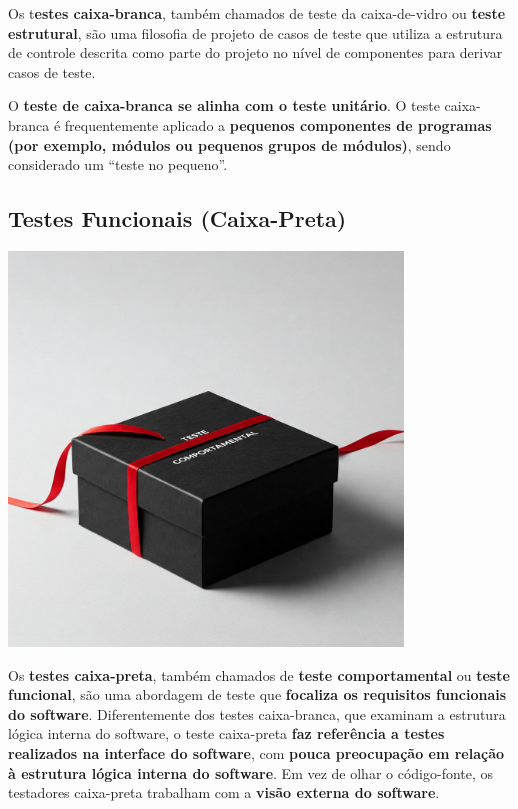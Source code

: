 \documentclass[
]{book}
\begin{document}
Os t\textbf{estes caixa-branca}, também chamados de teste da caixa-de-vidro ou \textbf{teste estrutural}, são uma filosofia de projeto de casos de teste que utiliza a estrutura de controle descrita como parte do projeto no nível de componentes para derivar casos de teste.

O \textbf{teste de caixa-branca se alinha com o teste unitário}. O teste caixa-branca é frequentemente aplicado a \textbf{pequenos componentes de programas (por exemplo, módulos ou pequenos grupos de módulos)}, sendo considerado um ``teste no pequeno''.

\subsection{Testes Funcionais (Caixa-Preta)}\label{testes-funcionais-caixa-preta}

\includegraphics[width=4.125in,height=\textheight]{images/VerificacaoValidacao/TestesSoftware/caixa_preta.jpeg}

Os \textbf{testes caixa-preta}, também chamados de \textbf{teste comportamental} ou \textbf{teste funcional}, são uma abordagem de teste que \textbf{focaliza os requisitos funcionais do software}. Diferentemente dos testes caixa-branca, que examinam a estrutura lógica interna do software, o teste caixa-preta \textbf{faz referência a testes realizados na interface do software}, com \textbf{pouca preocupação em relação à estrutura lógica interna do software}. Em vez de olhar o código-fonte, os testadores caixa-preta trabalham com a \textbf{visão externa do software}.
\end{document}

